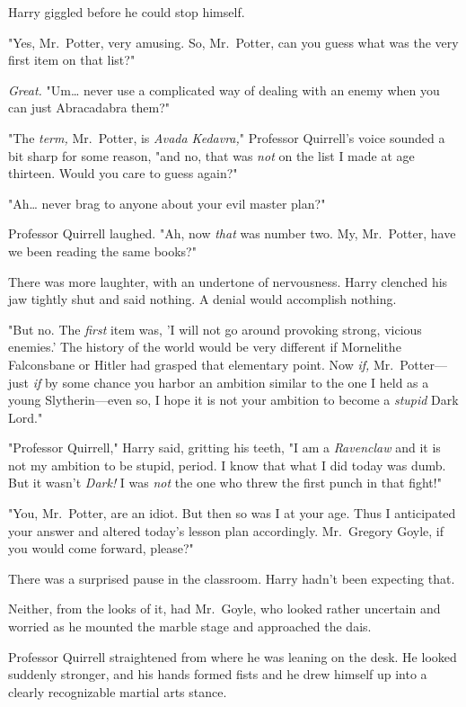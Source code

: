 Harry giggled before he could stop himself.

"Yes, Mr.~Potter, very amusing. So, Mr.~Potter, can you guess what was the very 
first item on that list?"

\emph{Great.} "Um{\ldots} never use a complicated way of dealing with an enemy 
when you can just Abracadabra them?"

"The \emph{term,} Mr.~Potter, is \emph{Avada Kedavra,}" Professor Quirrell's 
voice sounded a bit sharp for some reason, "and no, that was \emph{not} on the 
list I made at age thirteen. Would you care to guess again?"

"Ah{\ldots} never brag to anyone about your evil master plan?"

Professor Quirrell laughed. "Ah, now \emph{that} was number two. My, 
Mr.~Potter, have we been reading the same books?"

There was more laughter, with an undertone of nervousness. Harry clenched his 
jaw tightly shut and said nothing. A denial would accomplish nothing.

"But no. The \emph{first} item was, 'I will not go around provoking strong, 
vicious enemies.' The history of the world would be very different if 
Mornelithe Falconsbane or Hitler had grasped that elementary point. Now 
\emph{if,} Mr.~Potter---just \emph{if} by some chance you harbor an ambition 
similar to the one I held as a young Slytherin---even so, I hope it is not your 
ambition to become a \emph{stupid} Dark Lord."

"Professor Quirrell," Harry said, gritting his teeth, "I am a \emph{Ravenclaw} 
and it is not my ambition to be stupid, period. I know that what I did today 
was dumb. But it wasn't \emph{Dark!} I was \emph{not} the one who threw the 
first punch in that fight!"

"You, Mr.~Potter, are an idiot. But then so was I at your age. Thus I 
anticipated your answer and altered today's lesson plan accordingly. 
Mr.~Gregory Goyle, if you would come forward, please?"

There was a surprised pause in the classroom. Harry hadn't been expecting that.

Neither, from the looks of it, had Mr.~Goyle, who looked rather uncertain and 
worried as he mounted the marble stage and approached the dais.

Professor Quirrell straightened from where he was leaning on the desk. He 
looked suddenly stronger, and his hands formed fists and he drew himself up 
into a clearly recognizable martial arts stance.

